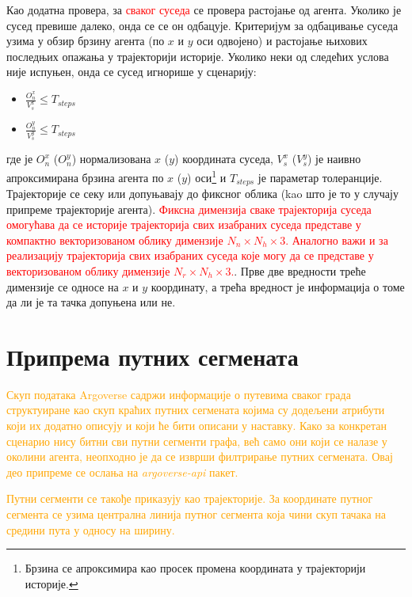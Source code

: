 \documentclass[11pt,oneside]{memoir}
\begin{document}
Као додатна провера, за \textcolor{red}{сваког суседа} се провера растојање од агента. Уколико је сусед превише далеко, онда се се он одбацује.
Критеријум за одбацивање суседа узима у обзир брзину агента (по $x$ и $y$ оси одвојено) и растојање њихових последњих опажања
у трајекторији историје. Уколико неки од следећих услова није
испуњен, онда се сусед игнорише у сценарију: 
\begin{itemize}
  \item $\frac{O_n^x}{V_s^x} \leq T_{steps}$
  \item $\frac{O_n^y}{V_s^y} \leq T_{steps}$
\end{itemize}
где је $O_n^x$ ($O_n^y$) нормализована $x$ ($y$) координата суседа, $V_s^x$ ($V_s^y$) је наивно 
апроксимирана брзина агента
по $x$ ($y$) оси\footnote{Брзина се апроксимира као просек промена координата у трајекторији историје.} и $T_{steps}$ је параметар толеранције.
Трајекторије се секу или допуњавају до фиксног облика (kao што је то у случају припреме трајекторије агента). 
\textcolor{red}{Фиксна димензија сваке трајекторија суседа омогућава да се историје трајекторија свих изабраних суседа представе у компактно векторизованом
облику димензије $N_n\times N_h\times 3$. Аналогно важи и за реализацију трајекторија свих изабраних суседа које могу да се представе у векторизованом
облику димензије $N_r\times N_h\times 3$.}. Прве две вредности треће димензије се односе на $x$ и $y$ координату, а 
трећа вредност је информација о томе да ли је та тачка допуњена или не.

\section{Припрема путних сегмената}

\textcolor{orange}{Скуп података \textcolor{orange}{Argoverse} садржи информације о путевима сваког града структуиране као скуп краћих путних сегмената
којима су додељени атрибути који их додатно описују и који ће бити описани у наставку. Како за конкретан сценарио нису битни сви путни сегменти
графа, већ само они који се налазе у околини агента, неопходно је да се изврши филтрирање путних сегмената. Овај део припреме се ослања на 
\textit{argoverse-api} пакет.}

\textcolor{orange}{Путни сегменти се такође приказују као трајекторије. За координате путног сегмента се узима централна линија путног сегмента
која чини скуп тачака на средини пута у односу на ширину.}
\end{document}
